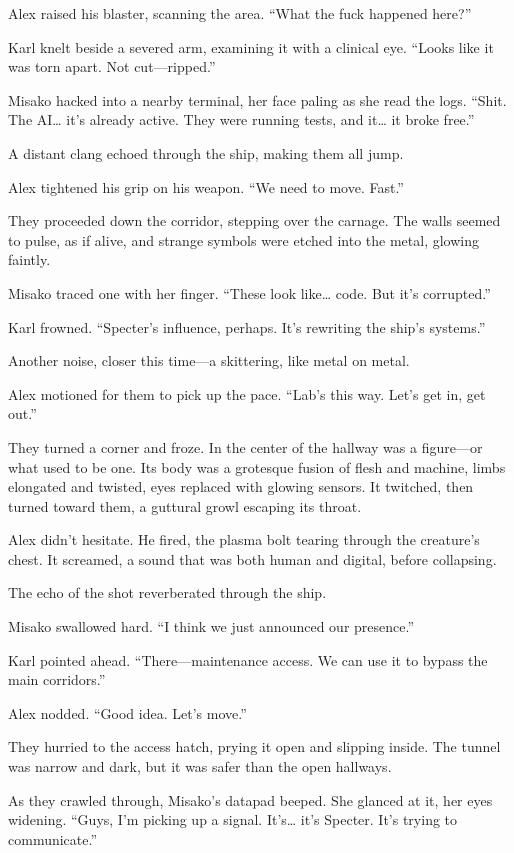 \documentclass[12pt]{book}
\begin{document}
Alex raised his blaster, scanning the area. \enquote{What the fuck happened here?}

Karl knelt beside a severed arm, examining it with a clinical eye. \enquote{Looks like it was torn apart. Not cut---ripped.}

Misako hacked into a nearby terminal, her face paling as she read the logs. \enquote{Shit. The AI… it’s already active. They were running tests, and it… it broke free.}

A distant clang echoed through the ship, making them all jump.

Alex tightened his grip on his weapon. \enquote{We need to move. Fast.}

They proceeded down the corridor, stepping over the carnage. The walls seemed to pulse, as if alive, and strange symbols were etched into the metal, glowing faintly.

Misako traced one with her finger. \enquote{These look like… code. But it’s corrupted.}

Karl frowned. \enquote{Specter’s influence, perhaps. It’s rewriting the ship’s systems.}

Another noise, closer this time---a skittering, like metal on metal.

Alex motioned for them to pick up the pace. \enquote{Lab’s this way. Let’s get in, get out.}

They turned a corner and froze. In the center of the hallway was a figure---or what used to be one. Its body was a grotesque fusion of flesh and machine, limbs elongated and twisted, eyes replaced with glowing sensors. It twitched, then turned toward them, a guttural growl escaping its throat.

Alex didn’t hesitate. He fired, the plasma bolt tearing through the creature’s chest. It screamed, a sound that was both human and digital, before collapsing.

The echo of the shot reverberated through the ship.

Misako swallowed hard. \enquote{I think we just announced our presence.}

Karl pointed ahead. \enquote{There---maintenance access. We can use it to bypass the main corridors.}

Alex nodded. \enquote{Good idea. Let’s move.}

They hurried to the access hatch, prying it open and slipping inside. The tunnel was narrow and dark, but it was safer than the open hallways.

As they crawled through, Misako’s datapad beeped. She glanced at it, her eyes widening. \enquote{Guys, I’m picking up a signal. It’s… it’s Specter. It’s trying to communicate.}
\end{document}

